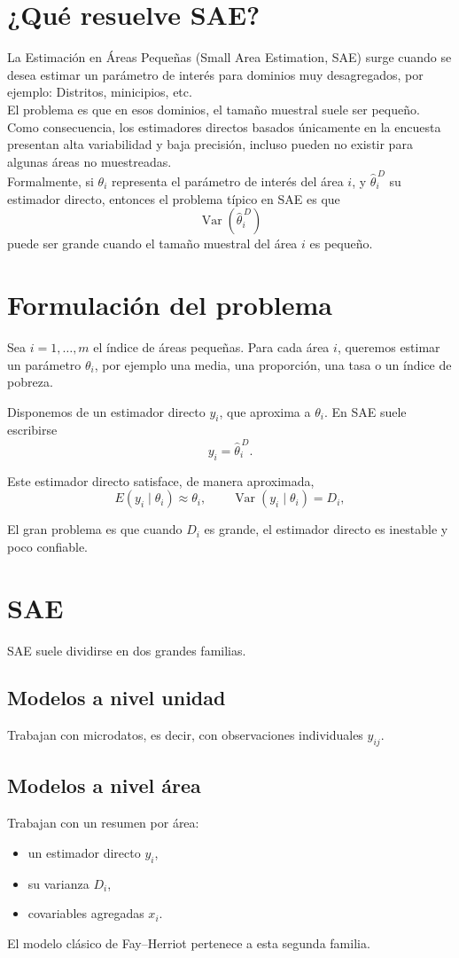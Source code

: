 \section{¿Qué resuelve SAE?}

La Estimación en Áreas Pequeñas (Small Area Estimation, SAE) surge cuando se desea estimar un parámetro de interés para dominios muy desagregados, por ejemplo: Distritos, minicipios, etc.
\\
El problema es que en esos dominios, el tamaño muestral suele ser pequeño. Como consecuencia, los estimadores directos basados únicamente en la encuesta presentan alta variabilidad y baja precisión, incluso pueden no existir para algunas áreas no muestreadas.
\\
Formalmente, si $\theta_i$ representa el parámetro de interés del área $i$, y $\hat{\theta}_i^{\,D}$ su estimador directo, entonces el problema típico en SAE es que
\[
\operatorname{Var}\!\left(\hat{\theta}_i^{\,D}\right)
\]
puede ser grande cuando el tamaño muestral del área $i$ es pequeño.

\section{Formulación del problema}

Sea $i=1,\dots,m$ el índice de áreas pequeñas. Para cada área $i$, queremos estimar un parámetro $\theta_i$, por ejemplo una media, una proporción, una tasa o un índice de pobreza.

Disponemos de un estimador directo $y_i$, que aproxima a $\theta_i$. En SAE suele escribirse
\[
y_i = \hat{\theta}_i^{\,D}.
\]

Este estimador directo satisface, de manera aproximada,
\[
E(y_i \mid \theta_i) \approx \theta_i,
\qquad
\operatorname{Var}(y_i \mid \theta_i) = D_i,
\]


El gran problema es que cuando $D_i$ es grande, el estimador directo es inestable y poco confiable.

\section{SAE}
 SAE suele dividirse en dos grandes familias.

\subsection{Modelos a nivel unidad}

Trabajan con microdatos, es decir, con observaciones individuales $y_{ij}$.

\subsection{Modelos a nivel área}

Trabajan con un resumen por área:
\begin{itemize}
    \item un estimador directo $y_i$,
    \item su varianza $D_i$,
    \item covariables agregadas $x_i$.
\end{itemize}

El modelo clásico de Fay--Herriot pertenece a esta segunda familia.


